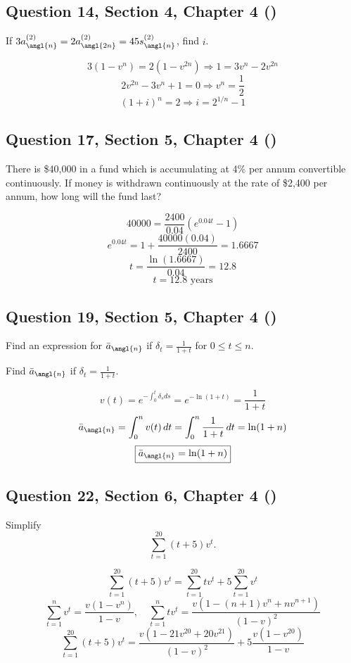 \documentclass[12pt, a4paper]{article}
\begin{document}
\subsection*{Question 14, Section 4, Chapter 4  (\cite{toi3rd})}

\noindent If \( 3 a_{\angl{n}}^{(2)} = 2 a_{\angl{2n}}^{(2)} = 45 s_{\angl{n}}^{(2)} \), find \( i \).

\[
3(1 - v^n) = 2(1 - v^{2n}) \Rightarrow 1 = 3v^n - 2v^{2n}
\]
\[
2v^{2n} - 3v^n + 1 = 0 \Rightarrow v^n = \frac{1}{2}
\]
\[
(1 + i)^n = 2 \Rightarrow \boxed{i = 2^{1/n} - 1}
\]


\subsection*{Question 17, Section 5, Chapter 4  (\cite{toi3rd})}

\noindent There is \$40{,}000 in a fund which is accumulating at 4\% per annum convertible continuously. If money is withdrawn continuously at the rate of \$2{,}400 per annum, how long will the fund last?

\[
40000 = \frac{2400}{0.04}(e^{0.04t} - 1)
\]
\[
e^{0.04t} = 1 + \frac{40000(0.04)}{2400} = 1.6667
\]
\[
t = \frac{\ln(1.6667)}{0.04} = 12.8
\]
\[
\boxed{t = 12.8 \text{ years}}
\]

\subsection*{Question 19, Section 5, Chapter 4  (\cite{toi3rd})}

\noindent Find an expression for \( \bar{a}_{\angl{n}} \) if \( \delta_t = \frac{1}{1 + t} \) for \( 0 \le t \le n. \)

Find \( \bar{a}_{\angl{n}} \) if \( \delta_t = \frac{1}{1 + t} \).

\[
v(t) = e^{-\int_0^t \delta_s ds} = e^{-\ln(1 + t)} = \frac{1}{1 + t}
\]
\[
\bar{a}_{\angl{n}} = \int_0^n v(t)\,dt = \int_0^n \frac{1}{1 + t}\,dt = \ln(1 + n)
\]
\[
\boxed{\bar{a}_{\angl{n}} = \ln(1 + n)}
\]

\subsection*{Question 22, Section 6, Chapter 4  (\cite{toi3rd})}

\noindent Simplify
\[
\sum_{t=1}^{20} (t + 5)v^t.
\]

\[
\sum_{t=1}^{20} (t + 5)v^t = \sum_{t=1}^{20} t v^t + 5 \sum_{t=1}^{20} v^t
\]
\[
\sum_{t=1}^{n} v^t = \frac{v(1 - v^n)}{1 - v}, \quad
\sum_{t=1}^{n} t v^t = \frac{v(1 - (n+1)v^n + n v^{n+1})}{(1 - v)^2}
\]
\[
\boxed{\sum_{t=1}^{20} (t + 5)v^t =
\frac{v(1 - 21v^{20} + 20v^{21})}{(1 - v)^2}
+ 5\frac{v(1 - v^{20})}{1 - v}}
\]
\end{document}
